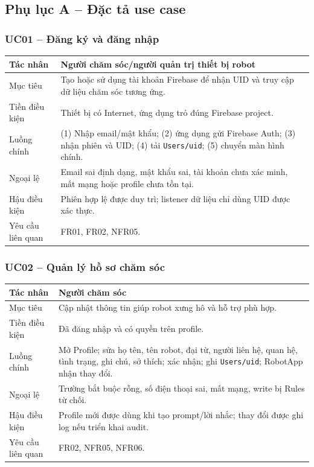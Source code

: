 
\subsection*{Phụ lục A -- Đặc tả use case}

\subsubsection*{UC01 -- Đăng ký và đăng nhập}

\begin{longtable}{|p{3.3cm}|p{10.1cm}|}
\hline
Tác nhân & Người chăm sóc/người quản trị thiết bị robot \\
\hline
Mục tiêu & Tạo hoặc sử dụng tài khoản Firebase để nhận UID và truy cập dữ liệu chăm sóc tương ứng. \\
\hline
Tiền điều kiện & Thiết bị có Internet, ứng dụng trỏ đúng Firebase project. \\
\hline
Luồng chính & (1) Nhập email/mật khẩu; (2) ứng dụng gửi Firebase Auth; (3) nhận phiên và UID; (4) tải \texttt{Users/uid}; (5) chuyển màn hình chính. \\
\hline
Ngoại lệ & Email sai định dạng, mật khẩu sai, tài khoản chưa xác minh, mất mạng hoặc profile chưa tồn tại. \\
\hline
Hậu điều kiện & Phiên hợp lệ được duy trì; listener dữ liệu chỉ dùng UID được xác thực. \\
\hline
Yêu cầu liên quan & FR01, FR02, NFR05. \\
\hline
\end{longtable}

\subsubsection*{UC02 -- Quản lý hồ sơ chăm sóc}

\begin{longtable}{|p{3.3cm}|p{10.1cm}|}
\hline
Tác nhân & Người chăm sóc \\
\hline
Mục tiêu & Cập nhật thông tin giúp robot xưng hô và hỗ trợ phù hợp. \\
\hline
Tiền điều kiện & Đã đăng nhập và có quyền trên profile. \\
\hline
Luồng chính & Mở Profile; sửa họ tên, tên robot, đại từ, người liên hệ, quan hệ, tình trạng, ghi chú, sở thích; xác nhận; ghi \texttt{Users/uid}; RobotApp nhận thay đổi. \\
\hline
Ngoại lệ & Trường bắt buộc rỗng, số điện thoại sai, mất mạng, write bị Rules từ chối. \\
\hline
Hậu điều kiện & Profile mới được dùng khi tạo prompt/lời nhắc; thay đổi được ghi log nếu triển khai audit. \\
\hline
Yêu cầu liên quan & FR02, NFR05, NFR06. \\
\hline
\end{longtable}


